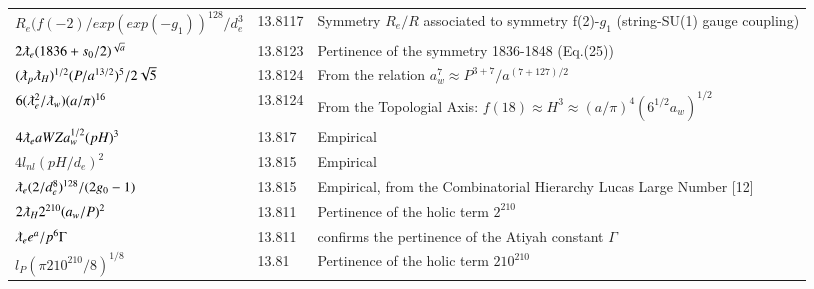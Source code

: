 \documentclass[a4paper,9pt]{article}
\begin{document}
\begin{table}
\begin{tabular}{lll}
 
 $ R_e ({f(-2)}/exp(exp(-g_1))^{128}/d_e^3$  & 13.8117    & Symmetry $R_e/R$ associated to symmetry f(2)-$g_1$  (string-SU(1) gauge coupling)     \\
 
 
 
 



 $ 2\lambdabar_{e} (1836+s_0/2)^{\sqrt a} $  & 13.8123 & Pertinence of the symmetry 1836-1848 (Eq.(25))\\

  
  $ (\lambdabar_{p} \lambdabar_{H})^{1/2} (P/a^{13/2})^5/2\sqrt 5 $  & 13.8124 & From the relation $a_w^7 \approx P^{3+7}/a^{(7 + 127)/2}$ \cite{Sanchez3}\\
 
  
  $6(\lambdabar_{e}^2/\lambdabar_w)(a/\pi)^{16}$  & 13.8124    & From the Topologial Axis: $f(18)\approx H^3 \approx (a/\pi)^4 (6^{1/2}a_w)^{1/2}$  \\
  
  
  
   
  $4\lambdabar_e a WZ a_w^{1/2} (pH)^3$  & 13.817    & Empirical \\
  
  $4l_{nl} (pH/d_e)^2$  & 13.815    & Empirical \\
  
 $\lambdabar_e (2/d_e^8)^{128}/(2g_0-1)$  & 13.815    &  Empirical, from the Combinatorial Hierarchy Lucas Large Number [12] \\ 
  
  
  $ 2\lambdabar_{H}2^{210} (a_w/P)^2  $ & 13.811 & Pertinence of the holic term $2^{210}$ \\
  
  $ \lambdabar_e e^a/p^6\Gamma$ & 13.811 & confirms the pertinence of the Atiyah constant $\Gamma$  \\
  
  
  
  
  
 
  
  
  $ l_{P} (\pi 210^{210}/8)^{1/8}$  & 13.81    & Pertinence of the holic term $210^{210}$  \\
  

\end{tabular}
\end{table}
\end{document}
